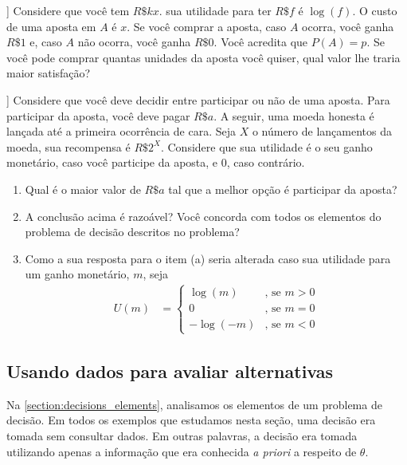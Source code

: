 \begin{exercise}]
 Considere que você tem $R\$kx$.
 sua utilidade para ter $R\$f$ é $\log(f)$.
 O custo de uma aposta em $A$ é $x$.
 Se você comprar a aposta,
 caso $A$ ocorra, você ganha $R\$1$ e,
 caso $A$ não ocorra, você ganha $R\$0$.
 Você acredita que $P(A) = p$.
 Se você pode comprar quantas unidades da
 aposta você quiser, qual valor
 lhe traria maior satisfação?
\end{exercise}

\begin{exercise}]
 Considere que você deve decidir entre
 participar ou não de uma aposta.
 Para participar da aposta, 
 você deve pagar $R\$a$.
 A seguir, uma moeda honesta é lançada até a
 primeira ocorrência de cara. Seja $X$ o
 número de lançamentos da moeda,
 sua recompensa é $R\$2^{X}$.
 Considere que sua utilidade é o seu ganho monetário,
 caso você participe da aposta, e $0$, caso contrário.
 \begin{enumerate}[label=(\alph*)]
  \item Qual é o maior valor de $R\$a$ tal que
  a melhor opção é participar da aposta?
  \item A conclusão acima é razoável?
  Você concorda com todos os elementos
  do problema de decisão descritos no problema?
  \item Como a sua resposta para o item (a) seria
  alterada caso sua utilidade para
  um ganho monetário, $m$, seja
  \begin{align*}
   U(m)	&=
   \begin{cases}
    \log(m) & \text{, se $m > 0$} \\
    0 & \text{, se $m = 0$} \\
    -\log(-m) & \text{, se $m < 0$}
   \end{cases}
  \end{align*}
 \end{enumerate}
\end{exercise}

\subsection{Usando dados para avaliar alternativas}

Na \cref{section:decisions_elements},
analisamos os elementos de um problema de decisão.
Em todos os exemplos que estudamos nesta seção,
uma decisão era tomada sem consultar dados.
Em outras palavras, a decisão era tomada utilizando
apenas a informação que era conhecida \emph{a priori}
a respeito de $\theta$.

